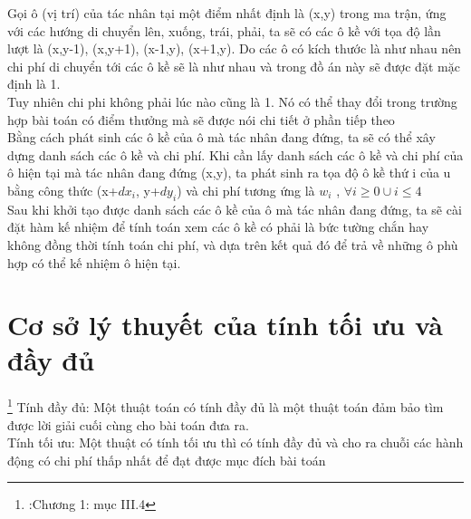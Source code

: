 \documentclass[11pt]{scrartcl} %
\begin{document}
Gọi ô (vị trí) của tác nhân tại một điểm nhất định là (x,y) trong ma trận, ứng với các hướng di chuyển lên, xuống, trái, phải, ta sẽ có các ô kề với tọa độ lần lượt là (x,y-1), (x,y+1), (x-1,y), (x+1,y). Do các ô có kích thước là như nhau nên chi phí di chuyển tới các ô kề sẽ là như nhau và trong đồ án này sẽ được đặt mặc định là 1.\\
Tuy nhiên chi phi không phải lúc nào cũng là 1. Nó có thể thay đổi trong trường hợp bài toán có điểm thưởng mà sẽ được nói chi tiết ở phần tiếp theo\\
Bằng cách phát sinh các ô kề của ô mà tác nhân đang đứng, ta sẽ có thể xây dựng danh sách các ô kề và chi phí. Khi cần lấy danh sách các ô kề và chi phí của ô hiện tại mà tác nhân đang đứng (x,y), ta phát sinh ra tọa độ ô kề thứ i của u bằng công thức (x+$dx_{i}$, y+$dy_{i}$) và chi phí tương ứng là $w_{i}$ , $\forall{i\ge0}\cup{i\le4}$\\

Sau khi khởi tạo được danh sách các ô kề của ô mà tác nhân đang đứng, ta sẽ cài đặt hàm kế nhiệm để tính toán xem các ô kề có phải là bức tường chắn hay không đồng thời tính toán chi phí, và dựa trên kết quả đó để trả về những ô phù hợp có thể kế nhiệm ô hiện tại.
\section{Cơ sở lý thuyết của tính tối ưu và đầy đủ}
\footnote{\cite{csttnt_lhb}:Chương 1: mục III.4} 
Tính đầy đủ: Một thuật toán có tính đầy đủ là một thuật toán đảm bảo tìm được lời giải cuối cùng cho bài toán đưa ra.\\
Tính tối ưu: Một thuật có tính tối ưu thì có tính đầy đủ và cho ra chuỗi các hành động có chi phí thấp nhất để đạt được mục đích bài toán\\
\end{document}
